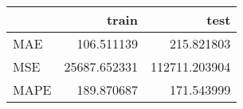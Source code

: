 \begin{tabular}{lrr}
\toprule
{} &         train &           test \\
\midrule
MAE  &    106.511139 &     215.821803 \\
MSE  &  25687.652331 &  112711.203904 \\
MAPE &    189.870687 &     171.543999 \\
\bottomrule
\end{tabular}
